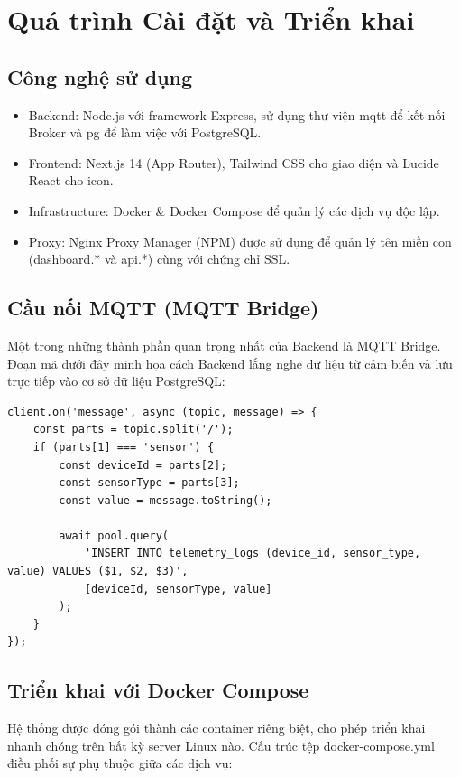 \newpage
\section{Quá trình Cài đặt và Triển khai}

\subsection{Công nghệ sử dụng}
\begin{itemize}
    \item Backend: Node.js với framework Express, sử dụng thư viện mqtt để kết nối Broker và pg để làm việc với PostgreSQL.
    \item Frontend: Next.js 14 (App Router), Tailwind CSS cho giao diện và Lucide React cho icon.
    \item Infrastructure: Docker \& Docker Compose để quản lý các dịch vụ độc lập.
    \item Proxy: Nginx Proxy Manager (NPM) được sử dụng để quản lý tên miền con (dashboard.* và api.*) cùng với chứng chỉ SSL.
\end{itemize}

\subsection{Cầu nối MQTT (MQTT Bridge)}
Một trong những thành phần quan trọng nhất của Backend là MQTT Bridge. Đoạn mã dưới đây minh họa cách Backend lắng nghe dữ liệu từ cảm biến và lưu trực tiếp vào cơ sở dữ liệu PostgreSQL:

\begin{verbatim}
client.on('message', async (topic, message) => {
    const parts = topic.split('/');
    if (parts[1] === 'sensor') {
        const deviceId = parts[2];
        const sensorType = parts[3];
        const value = message.toString();

        await pool.query(
            'INSERT INTO telemetry_logs (device_id, sensor_type, value) VALUES ($1, $2, $3)',
            [deviceId, sensorType, value]
        );
    }
});
\end{verbatim}

\subsection{Triển khai với Docker Compose}
Hệ thống được đóng gói thành các container riêng biệt, cho phép triển khai nhanh chóng trên bất kỳ server Linux nào. Cấu trúc tệp docker-compose.yml điều phối sự phụ thuộc giữa các dịch vụ:

